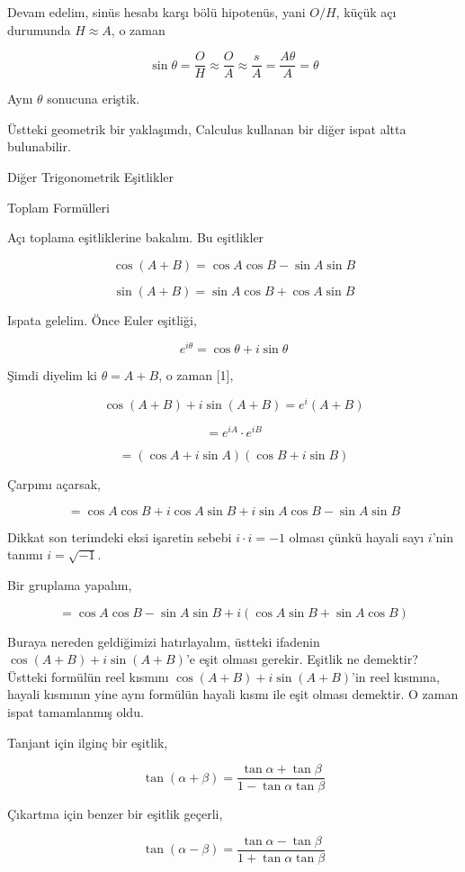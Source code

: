 \documentclass[12pt,fleqn]{article}\usepackage{../../common}
\begin{document}
Devam edelim, sinüs hesabı karşı bölü hipotenüs, yani $O / H$, küçük açı
durumunda $H \approx A$, o zaman

$$
\sin \theta = \frac{O}{H} \approx \frac{O}{A} \approx \frac{s}{A} = \frac{A\theta}{A} = \theta
$$

Aynı $\theta$ sonucuna eriştik. 

Üstteki geometrik bir yaklaşımdı, Calculus kullanan bir diğer ispat altta
bulunabilir.

Diğer Trigonometrik Eşitlikler

Toplam Formülleri

Açı toplama eşitliklerine bakalım. Bu eşitlikler

$$
\cos(A+B) = \cos A \cos B - \sin A \sin B
$$

$$
\sin(A+B) = \sin A \cos B + \cos A \sin B
$$

Ispata gelelim. Önce Euler eşitliği,

$$
e^{i\theta} = \cos\theta + i\sin\theta
$$

Şimdi diyelim ki $\theta = A+B$, o zaman [1],

$$
\cos(A+B) + i\sin(A+B) = e^i(A+B)
$$

$$
= e^{iA} \cdot e^{iB}
$$

$$
= (\cos A + i\sin A) (\cos B + i\sin B)
$$

Çarpımı açarsak,

$$
= \cos A \cos B + i\cos A \sin B +
i\sin A \cos B - \sin A \sin B
$$

Dikkat son terimdeki eksi işaretin sebebi $i \cdot i = -1$ olması çünkü hayali
sayı $i$'nin tanımı $i = \sqrt{-1}$. 

Bir gruplama yapalım, 

$$
= \cos A \cos B - \sin A \sin B + i (\cos A \sin B + \sin A \cos B )
$$

Buraya nereden geldiğimizi hatırlayalım, üstteki ifadenin $\cos(A+B) + i\sin(A+B)$'e
eşit olması gerekir. Eşitlik ne demektir? Üstteki formülün reel kısmını
$\cos(A+B) + i\sin(A+B)$'in reel kısmına, hayali kısmının yine aynı formülün
hayali kısmı ile eşit olması demektir. O zaman ispat tamamlanmış oldu.

Tanjant için ilginç bir eşitlik,

$$
\tan (\alpha + \beta) = \frac{\tan\alpha + \tan\beta}{1 - \tan\alpha \tan\beta}
$$

Çıkartma için benzer bir eşitlik geçerli,

$$
\tan (\alpha - \beta) = \frac{\tan\alpha - \tan\beta}{1 + \tan\alpha \tan\beta}
$$
\end{document}
